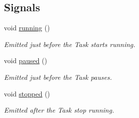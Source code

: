 \subsection*{Signals}
\begin{DoxyCompactItemize}
\item 
\hypertarget{class_test_playback_controller_ae02259c2ad0ea392389640b93326aebd}{void \hyperlink{class_test_playback_controller_ae02259c2ad0ea392389640b93326aebd}{running} ()}\label{class_test_playback_controller_ae02259c2ad0ea392389640b93326aebd}

\begin{DoxyCompactList}\small\item\em Emitted just before the Task starts running. \end{DoxyCompactList}\item 
\hypertarget{class_test_playback_controller_aced0e7caa22e3369b6a564917880c9af}{void \hyperlink{class_test_playback_controller_aced0e7caa22e3369b6a564917880c9af}{paused} ()}\label{class_test_playback_controller_aced0e7caa22e3369b6a564917880c9af}

\begin{DoxyCompactList}\small\item\em Emitted just before the Task pauses. \end{DoxyCompactList}\item 
\hypertarget{class_test_playback_controller_a3ff862f1e1ff73faa49fdab265645625}{void \hyperlink{class_test_playback_controller_a3ff862f1e1ff73faa49fdab265645625}{stopped} ()}\label{class_test_playback_controller_a3ff862f1e1ff73faa49fdab265645625}

\begin{DoxyCompactList}\small\item\em Emitted after the Task stop running. \end{DoxyCompactList}\end{DoxyCompactItemize}
